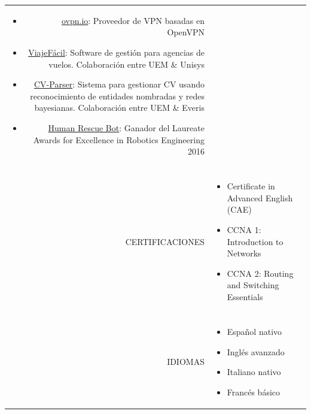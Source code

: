 \documentclass[a4paper, 11pt]{article}
\begin{document}
\begin{longtable}{rp{11cm}}
\begin{itemize}[leftmargin=0cm,label={}]
            \item \href{https://ovpn.io}{ovpn.io}: Proveedor de VPN basadas en OpenVPN
            \item \href{https://github.com/hugo19941994/ViajeFacil}{ViajeFácil}: Software de gestión para agencias de vuelos. Colaboración entre UEM \& Unisys
            \item \href{https://github.com/hugo19941994/CV-Parser}{CV-Parser}: Sistema para gestionar CV usando reconocimiento de entidades nombradas y redes bayesianas. Colaboración entre UEM \& Everis
            \item \href{https://github.com/hugo19941994/robot}{Human Rescue Bot}: Ganador del Laureate Awards for Excellence in Robotics Engineering 2016
        \end{itemize}\\
        \\
        CERTIFICACIONES
        & \vspace{-8mm}
        \begin{itemize}[leftmargin=0cm,label={},noitemsep]
            \item Certificate in Advanced English (CAE)
            \item CCNA 1: Introduction to Networks
            \item CCNA 2: Routing and Switching Essentials
        \end{itemize}\\
        \\
        IDIOMAS
        & \vspace{-8mm}
        \begin{itemize}[leftmargin=0cm,label={},noitemsep]
            \item Español nativo
            \item Inglés avanzado
            \item Italiano nativo
            \item Francés básico
        \end{itemize}
    \end{longtable}
\end{document}
